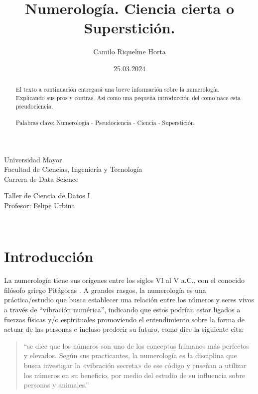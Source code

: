 \documentclass{article}
\title{\textbf{Numerología. Ciencia cierta o Superstición.}}
\author{Camilo Riquelme Horta}
\date{25.03.2024}
\begin{document}
	
	\begin{minipage}{0.5\textwidth}
		\begin{flushleft}
			Universidad Mayor \\Facultad de Ciencias, Ingeniería y Tecnología \\Carrera de Data Science
		\end{flushleft}
	\end{minipage}
	\begin{minipage}{0.5\textwidth}
		\begin{flushright}
			Taller de Ciencia de Datos I \\Profesor: Felipe Urbina
		\end{flushright}
	\end{minipage}\\
	
	\begin{minipage}{395px}
		\maketitle
	\end{minipage}
	
	\begin{abstract}
		El texto a continuación entregará una breve información sobre la numerología. Explicando sus pros y contras. Así como una pequeña introducción del como nace esta pseudociencia.
		\\\\Palabras clave: Numerología - Pseudociencia - Ciencia - Superstición.
	\end{abstract}
	
	\section*{Introducción}
	
	La numerología tiene sus orígenes entre los siglos VI al V a.C., con el conocido filósofo griego Pitágoras \cite{wikipedia}. A grandes rasgos, la numerología es una práctica/estudio que busca establecer una relación entre los números y seres vivos a través de “vibración numérica”, indicando que estos podrían estar ligados a fuerzas físicas y/o espirituales promoviendo el entendimiento sobre la forma de actuar de las personas e incluso predecir su futuro, como dice la siguiente cita:\\
	
	\begin{adjustwidth}{1cm}{1cm}
		\small
		\begin{quote}
			“se dice que los números son uno de los conceptos humanos más perfectos y elevados. Según sus practicantes, la numerología es la disciplina que busca investigar la «vibración secreta» de ese código y enseñan a utilizar los números en su beneficio, por medio del estudio de su influencia sobre personas y animales.”\cite{wikipedia}\\
		\end{quote}
	\end{adjustwidth}
	
\end{document}
